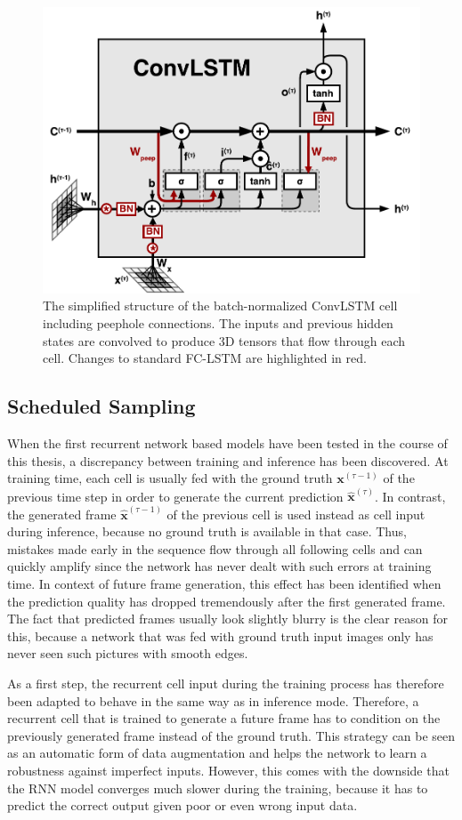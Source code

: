 \begin{figure}[htpb]
	\centering
	\includegraphics[width=0.7\linewidth]{figures/convlstm.pdf} 
	\caption[ConvLSTM Cell]{The simplified structure of the batch-normalized ConvLSTM cell including peephole connections. The inputs and previous hidden states are convolved to produce 3D tensors that flow through each cell. Changes to standard FC-LSTM are highlighted in red.} \label{fig:convlstm-cell}
\end{figure}


\subsection{Scheduled Sampling} \label{sec:sched_sample}

When the first recurrent network based models have been tested in the course of this thesis, a discrepancy between training and inference has been discovered. At training time, each cell is usually fed with the ground truth $\textbf{x}^{(\tau-1)}$ of the previous time step in order to generate the current prediction $\hat{\textbf{x}}^{(\tau)}$. In contrast, the generated frame $ \hat{\textbf{x}}^{(\tau-1)}$ of the previous cell is used instead as cell input during inference, because no ground truth is available in that case. Thus, mistakes made early in the sequence flow through all following cells and can quickly amplify since the network has never dealt with such errors at training time. In context of future frame generation, this effect has been identified when the prediction quality has dropped tremendously after the first generated frame. The fact that predicted frames usually look slightly blurry is the clear reason for this, because a network that was fed with ground truth input images only has never seen such pictures with smooth edges.

As a first step, the recurrent cell input during the training process has therefore been adapted to behave in the same way as in inference mode. Therefore, a recurrent cell that is trained to generate a future frame has to condition on the previously generated frame instead of the ground truth. This strategy can be seen as an automatic form of data augmentation and helps the network to learn a robustness against imperfect inputs. However, this comes with the downside that the RNN model converges much slower during the training, because it has to predict the correct output given poor or even wrong input data.

